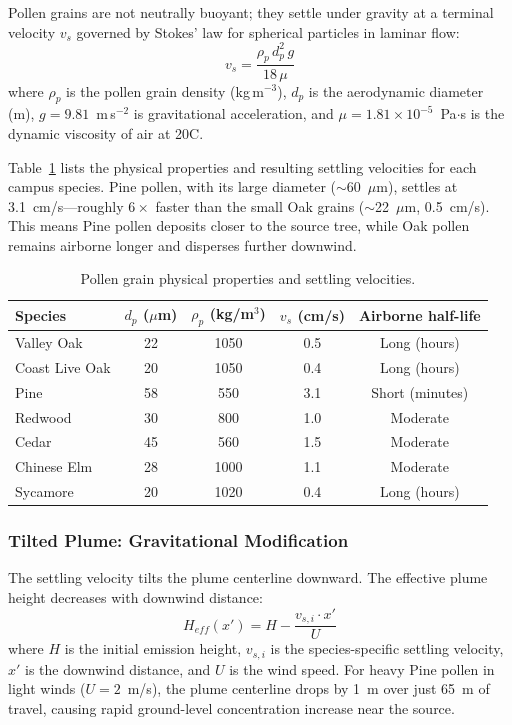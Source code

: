 \documentclass[11pt]{article}
\begin{document}
Pollen grains are not neutrally buoyant; they settle under gravity at a terminal velocity $v_s$ governed by Stokes' law for spherical particles in laminar flow:
\begin{equation}
v_s = \frac{\rho_p \, d_p^2 \, g}{18 \, \mu}
\label{eq:stokes}
\end{equation}
where $\rho_p$ is the pollen grain density (kg\,m$^{-3}$), $d_p$ is the aerodynamic diameter (m), $g = 9.81$~m\,s$^{-2}$ is gravitational acceleration, and $\mu = 1.81 \times 10^{-5}$~Pa$\cdot$s is the dynamic viscosity of air at 20\textdegree C.

Table~\ref{tab:pollen_physics} lists the physical properties and resulting settling velocities for each campus species. Pine pollen, with its large diameter ($\sim$60~$\mu$m), settles at 3.1~cm/s---roughly $6\times$ faster than the small Oak grains ($\sim$22~$\mu$m, 0.5~cm/s). This means Pine pollen deposits closer to the source tree, while Oak pollen remains airborne longer and disperses further downwind.

\begin{table}[h]
\centering
\caption{Pollen grain physical properties and settling velocities.}
\label{tab:pollen_physics}
\begin{tabular}{@{}lcccc@{}}
\toprule
Species & $d_p$ ($\mu$m) & $\rho_p$ (kg/m$^3$) & $v_s$ (cm/s) & Airborne half-life \\
\midrule
Valley Oak & 22 & 1050 & 0.5 & Long (hours) \\
Coast Live Oak & 20 & 1050 & 0.4 & Long (hours) \\
Pine & 58 & 550 & 3.1 & Short (minutes) \\
Redwood & 30 & 800 & 1.0 & Moderate \\
Cedar & 45 & 560 & 1.5 & Moderate \\
Chinese Elm & 28 & 1000 & 1.1 & Moderate \\
Sycamore & 20 & 1020 & 0.4 & Long (hours) \\
\bottomrule
\end{tabular}
\end{table}

\subsubsection{Tilted Plume: Gravitational Modification}

The settling velocity tilts the plume centerline downward. The effective plume height decreases with downwind distance:
\begin{equation}
H_{eff}(x') = H - \frac{v_{s,i} \cdot x'}{U}
\label{eq:tilt}
\end{equation}
where $H$ is the initial emission height, $v_{s,i}$ is the species-specific settling velocity, $x'$ is the downwind distance, and $U$ is the wind speed. For heavy Pine pollen in light winds ($U = 2$~m/s), the plume centerline drops by 1~m over just 65~m of travel, causing rapid ground-level concentration increase near the source.
\end{document}
